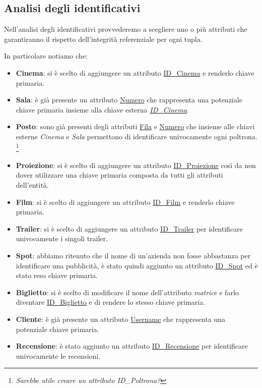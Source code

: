             
        \subsection{Analisi degli identificativi}
            Nell'analisi degli identificativi provvederemo a scegliere uno o più attributi che garantiranno il rispetto dell'integrità referenziale per ogni tupla.
            
            In particolare notiamo che:
 \begin{itemize}
 
 
     \item \textbf{Cinema}: si è scelto di aggiungere un attributo \underline{ID\_Cinema} e renderlo chiave primaria.
     
     \item \textbf{Sala}: è già presente un attributo \underline{Numero} che rappresenta una potenziale chiave primaria insieme alla chiave esterna \underline{\textit{ID\_Cinema}}.
     
     \item \textbf{Posto}: sono già presenti degli attributi \underline{Fila} e \underline{Numero} che insieme alle chiavi esterne \textit{Cinema} e \textit{Sala} permettono di identificare univocamente ogni poltrona.
     \footnote{\textit{Sarebbe utile creare un attributo ID\_Poltrona?}}
    
     
     \item \textbf{Proiezione}: si è scelto di aggiungere un attributo \underline{ID\_Proiezione} così da non dover utilizzare una chiave primaria composta da tutti gli attributi dell'entità.
     
     \item \textbf{Film}: si è scelto di aggiungere un attributo \underline{ID\_Film} e renderlo chiave primaria.
     
     \item \textbf{Trailer}: si è scelto di aggiungere un attributo \underline{ID\_Trailer} per identificare univocamente i singoli trailer.
     
     \item \textbf{Spot}: abbiamo ritenuto che il nome di un'azienda non fosse abbastanza per identificare una pubblicità, è stato quindi aggiunto un attributo \underline{ID\_Spot} ed è stato reso chiave primaria.
     
     \item \textbf{Biglietto}: si è scelto di modificare il nome dell'attributo \textit{matrice} e farlo diventare \underline{ID\_Biglietto} e di rendere lo stesso chiave primaria.
     
     \item \textbf{Cliente}: è già presente un attributo \underline{Username} che rappresenta una potenziale chiave primaria.
     
     \item \textbf{Recensione}: è stato aggiunto un attributo \underline{ID\_Recensione} per identificare univocamente le recensioni. 
     
     
 \end{itemize}
 

